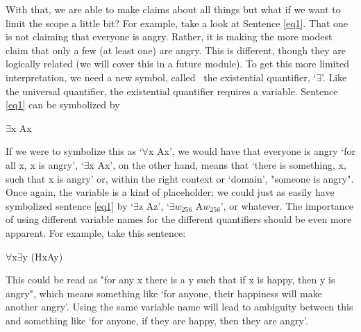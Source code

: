 With that, we are able to make claims about all things but what if we want to limit the scope a little bit? For example, take a look at Sentence \ref{eq1}. That one is not claiming that everyone is angry. Rather, it is making the more modest claim that only a few (at least one) are angry. This is different, though they are logically related (we will cover this in a future module). To get this more limited interpretation, we need a new symbol, called  the \gls{existential quantifier}, ‘$\exists$’. Like the universal quantifier, the existential quantifier requires a variable. Sentence \ref{eq1} can be symbolized by
\begin{center}
$\exists$x Ax
\end{center}
If we were to symbolize this as ‘$\forall$x Ax’, we would have that everyone is angry ‘for all x, x is angry’, ‘$\exists$x Ax’, on the other hand, means that ‘there is something, x, such that x is angry’ or, within the right context or ‘domain', "someone is angry". Once again, the variable is a kind of placeholder; we could just as easily have symbolized sentence \ref{eq1} by ‘$\exists$z Az’, ‘$\exists$$w_{256}$ A$w_{256}$’, or whatever. The importance of using different variable names for the different quantifiers should be even more apparent. For example, take this sentence:
\begin{center}
$\forall$x$\exists$y (Hx\eif Ay)
\end{center}
This could be read as "for any x there is a y such that if x is happy, then y is angry", which means something like ‘for anyone, their happiness will make another angry'. Using the same variable name will lead to ambiguity between this and something like ‘for anyone, if they are happy, then they are angry'.

